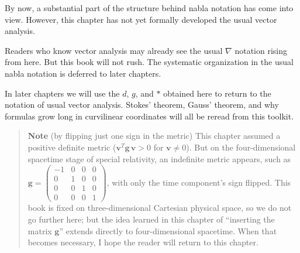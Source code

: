 \documentclass[a4paper,12pt,openany]{book}
\begin{document}
By now, a substantial part of the structure behind nabla notation has
come into view. However, this chapter has not yet formally developed the
usual vector analysis.

Readers who know vector analysis may already see the usual \(\nabla\)
notation rising from here. But this book will not rush. The systematic
organization in the usual nabla notation is deferred to later chapters.

In later chapters we will use the \(d\), \(g\), and \(\ast\) obtained
here to return to the notation of usual vector analysis. Stokes'
theorem, Gauss' theorem, and why formulas grow long in curvilinear
coordinates will all be reread from this toolkit.

\begin{quote}
\textbf{Note} (by flipping just one sign in the metric) This chapter
assumed a positive definite metric
(\(\mathbf{v}^T \mathbf{g} \,\mathbf{v} > 0\) for
\(\mathbf{v} \neq 0\)). But on the four-dimensional spacetime stage of
special relativity, an indefinite metric appears, such as
\(\mathbf{g} = \begin{pmatrix} -1 & 0 & 0 & 0 \\ 0 & 1 & 0 & 0 \\ 0 & 0 & 1 & 0 \\ 0 & 0 & 0 & 1 \end{pmatrix}\),
with only the time component's sign flipped. This book is fixed on
three-dimensional Cartesian physical space, so we do not go further
here; but the idea learned in this chapter of ``inserting the matrix
\(\mathbf{g}\)'' extends directly to four-dimensional spacetime. When
that becomes necessary, I hope the reader will return to this chapter.
\end{quote}

\par\vspace{0.35em}\par
\end{document}
